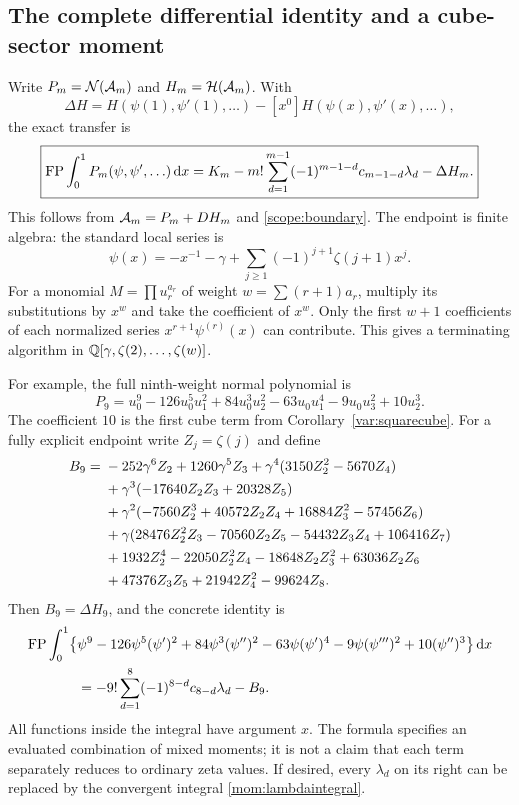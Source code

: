 \subsection{The complete differential identity and a cube-sector moment}

Write $P_m=\mathcal N(\mathcal A_m)$ and $H_m=\mathcal H(\mathcal A_m)$. With
\begin{equation}\label{mom:Delta}
 \Delta H=H(\psi(1),\psi'(1),\ldots)
        -[x^0]H(\psi(x),\psi'(x),\ldots),
\end{equation}
the exact transfer is
\begin{equation}\label{mom:transfer}
 \boxed{\displaystyle
 \operatorname{FP}\int_0^1P_m(\psi,\psi',\ldots)\,\mathrm d x
 =K_m-m!\sum_{d=1}^{m-1}(-1)^{m-1-d}c_{m-1-d}\lambda_d
       -\Delta H_m.}
\end{equation}
This follows from $\mathcal A_m=P_m+DH_m$ and
\eqref{scope:boundary}. The endpoint is finite algebra: the standard
local series \cite[Section 5.7]{DLMF} is
\[
 \psi(x)=-x^{-1}-\gamma+
             \sum_{j\ge1}(-1)^{j+1}\zeta(j+1)x^j.
\]
For a monomial $M=\prod u_r^{a_r}$ of weight
$w=\sum(r+1)a_r$, multiply its substitutions by $x^w$ and take
the coefficient of $x^w$. Only the first $w+1$ coefficients of each
normalized series $x^{r+1}\psi^{(r)}(x)$ can contribute. This gives
a terminating algorithm in $\mathbb Q[\gamma,\zeta(2),\ldots,\zeta(w)]$.

For example, the full ninth-weight normal polynomial is
\begin{equation}\label{mom:P9}
 P_9=u_0^9-126u_0^5u_1^2+84u_0^3u_2^2
       -63u_0u_1^4-9u_0u_3^2+10u_2^3.
\end{equation}
The coefficient $10$ is the first cube term from
Corollary~\ref{var:squarecube}. For a fully explicit endpoint write
$Z_j=\zeta(j)$ and define
\begin{align}\label{mom:B9}
 B_9={}&-252\gamma^6Z_2+1260\gamma^5Z_3
          +\gamma^4(3150Z_2^2-5670Z_4)\notag\\
 &+\gamma^3(-17640Z_2Z_3+20328Z_5)\notag\\
 &+\gamma^2(-7560Z_2^3+40572Z_2Z_4+16884Z_3^2-57456Z_6)\notag\\
 &+\gamma(28476Z_2^2Z_3-70560Z_2Z_5-54432Z_3Z_4+106416Z_7)\notag\\
 &+1932Z_2^4-22050Z_2^2Z_4-18648Z_2Z_3^2+63036Z_2Z_6\notag\\
 &+47376Z_3Z_5+21942Z_4^2-99624Z_8.
\end{align}
Then $B_9=\Delta H_9$, and the concrete identity is
\begin{align}\label{mom:ninthidentity}
 \operatorname{FP}\int_0^1\bigl\{&\psi^9-126\psi^5(\psi')^2
   +84\psi^3(\psi'')^2-63\psi(\psi')^4
   -9\psi(\psi''')^2+10(\psi'')^3\bigr\}\,\mathrm d x\notag\\
 &=-9!\sum_{d=1}^8(-1)^{8-d}c_{8-d}\lambda_d-B_9.
\end{align}
All functions inside the integral have argument $x$.
The formula specifies an evaluated combination of mixed moments;
it is not a claim that each term separately reduces to ordinary zeta
values. If desired, every $\lambda_d$ on its right can be replaced
by the convergent integral \eqref{mom:lambdaintegral}.

